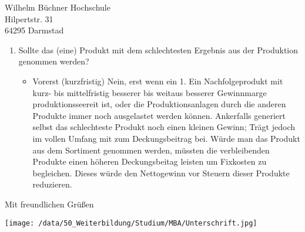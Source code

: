 \documentclass[
    version=last,           %
    DIV=13,                 %
    BCOR=0mm,               %
    paper=a4,               %
    fontsize=12pt,          %
    firsthead=on,           %
    firstfoot=on,           %
    pagenumber=on,i         %
    parskip=half,           %
    enlargefirstpage=,      %
    firsthead=on,           %
    fromrule=afteraddress,  %
    priority=off,           %
    backaddress=true,       %
    refline=dateright,      %
	fromalign=right,	    %
    fromemail=on,i          %
    fromurl=on,             %
    frombank=on,
    fromphone=on,           %
    frommobilephone=on      %
    fromlogo=on,            %
    addrfield=on,           %
    subject=untitled,  %
    foldmarks=off,          %
    numericaldate=off,      %
	pagenumber=right,	        %
	parskip=half,	        %
    headsep=false,          %
    footsepline=true,       %
    foldmarks=off,		    %
	]{scrlttr2}
\begin{document}
\begin{letter} {Wilhelm Büchner Hochschule \\
Hilpertstr. 31\\
64295 Darmstad}
\begin{enumerate}
\begin{enumerate}
        \end{enumerate}
    \item Sollte das (eine) Produkt mit dem schlechtesten Ergebnis aus der
        Produktion genommen werden?
        \begin{itemize}
            \item Vorerst (kurzfristig) Nein, erst
                wenn ein 1. Ein Nachfolgeprodukt mit kurz- bis mittelfristig
                besserer bis weitaus besserer Gewinnmarge produktionsseereit
                ist, oder die Produktionsanlagen durch die anderen Produkte
                immer noch ausgelastet werden können. Ankerfalls generiert
                selbst das schlechteste Produkt noch einen kleinen Gewinn; Trägt
                jedoch im vollen Umfang mit zum Deckungsbeitrag bei. Würde man
                das Produkt aus dem Sortiment genommen werden, müssten die
                verbleibenden Produkte einen höheren Deckungsbeitag leisten um
                Fixkosten zu begleichen. Dieses würde den Nettogewinn vor
                Steuern dieser Produkte reduzieren.
        \end{itemize}
\end{enumerate}

\closing{Mit freundlichen Grüßen}
    \texttt{[image: /data/50\_Weiterbildung/Studium/MBA/Unterschrift.jpg]}



%





\end{letter}
\end{document}
